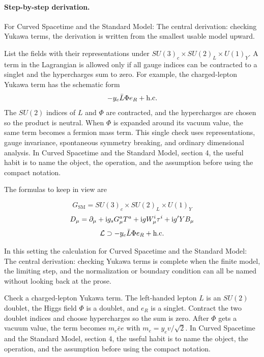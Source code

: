 \paragraph{Step-by-step derivation.}

For Curved Spacetime and the Standard Model: The central derivation: checking Yukawa terms, the derivation is written from the smallest usable model upward.

List the fields with their representations under \(SU(3)_c\times SU(2)_L\times U(1)_Y\).  A term in the Lagrangian is allowed only if all gauge indices can be contracted to a singlet and the hypercharges sum to zero.  For example, the charged-lepton Yukawa term has the schematic form
\[
  -y_e\bar L\Phi e_R+\hbox{h.c.}
\]
The \(SU(2)\) indices of \(L\) and \(\Phi\) are contracted, and the hypercharges are chosen so the product is neutral.  When \(\Phi\) is expanded around its vacuum value, the same term becomes a fermion mass term.  This single check uses representations, gauge invariance, spontaneous symmetry breaking, and ordinary dimensional analysis.  In Curved Spacetime and the Standard Model, section 4, the useful habit is to name the object, the operation, and the assumption before using the compact notation.

The formulas to keep in view are

\[
  G_{\mathrm{SM}}=SU(3)_c\times SU(2)_L\times U(1)_Y
\]
\[
  D_\mu=\partial_\mu+\mathrm i g_sG_\mu^aT^a+\mathrm i gW_\mu^i\tau^i+\mathrm i g'YB_\mu
\]
\[
  \mathcal L\supset -y_e\bar L\Phi e_R+\hbox{h.c.}
\]

In this setting the calculation for Curved Spacetime and the Standard Model: The central derivation: checking Yukawa terms is complete when the finite model, the limiting step, and the normalization or boundary condition can all be named without looking back at the prose.




\begin{example}
Check a charged-lepton Yukawa term.  The left-handed lepton \(L\) is an \(SU(2)\) doublet, the Higgs field \(\Phi\) is a doublet, and \(e_R\) is a singlet.  Contract the two doublet indices and choose hypercharges so the sum is zero.  After \(\Phi\) gets a vacuum value, the term becomes \(m_e\bar e e\) with \(m_e=y_ev/\sqrt2\).  In Curved Spacetime and the Standard Model, section 4, the useful habit is to name the object, the operation, and the assumption before using the compact notation.
\end{example}



